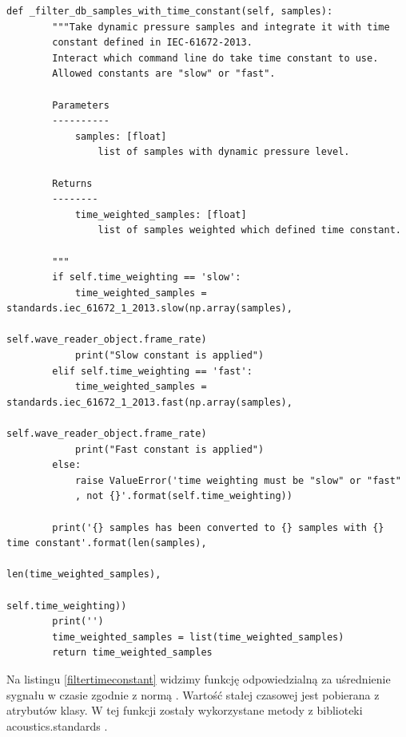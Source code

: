 \documentclass[eng,printmode]{mgr}
\begin{document}
\begin{minipage}{\linewidth}
\begin{lstlisting}[caption={fragment kodu źródłowego pliku SampledBConverter.py,\newline klasa SamplesDbFSConverter, metoda \_filte\_db\_samples\_with\_time\_constant},captionpos=b,label={filtertimeconstant}]
    def _filter_db_samples_with_time_constant(self, samples):
        """Take dynamic pressure samples and integrate it with time
        constant defined in IEC-61672-2013.
        Interact which command line do take time constant to use.
        Allowed constants are "slow" or "fast".

        Parameters
        ----------
            samples: [float]
                list of samples with dynamic pressure level.

        Returns
        --------
            time_weighted_samples: [float]
                list of samples weighted which defined time constant.

        """
        if self.time_weighting == 'slow':
            time_weighted_samples = standards.iec_61672_1_2013.slow(np.array(samples),
                                                                    self.wave_reader_object.frame_rate)
            print("Slow constant is applied")
        elif self.time_weighting == 'fast':
            time_weighted_samples = standards.iec_61672_1_2013.fast(np.array(samples),
                                                                    self.wave_reader_object.frame_rate)
            print("Fast constant is applied")
        else:
            raise ValueError('time weighting must be "slow" or "fast"
            , not {}'.format(self.time_weighting))

        print('{} samples has been converted to {} samples with {} time constant'.format(len(samples),
                                                                            len(time_weighted_samples),
                                                                            self.time_weighting))
        print('')
        time_weighted_samples = list(time_weighted_samples)
        return time_weighted_samples
\end{lstlisting}
\end{minipage}

Na listingu \ref{filtertimeconstant} widzimy funkcję odpowiedzialną za uśrednienie sygnału w czasie zgodnie z normą  \cite{IEC-61672-2013}. Wartość stałej czasowej jest pobierana z atrybutów klasy. W tej funkcji zostały wykorzystane metody z biblioteki acoustics.standards \cite{acoustics}.
\end{document}
